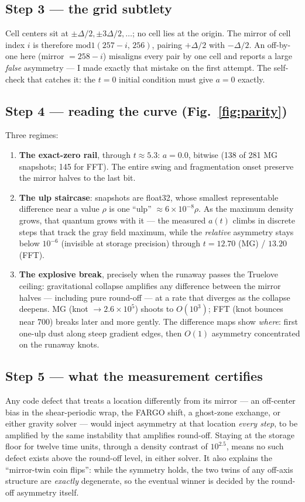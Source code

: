 \documentclass[11pt]{article}
\begin{document}
\subsection*{Step 3 --- the grid subtlety}
Cell centers sit at $\pm\Delta/2, \pm3\Delta/2,\ldots$; no cell lies at the origin.
The mirror of cell index $i$ is therefore $\mathrm{mod1}(257 - i,\,256)$, pairing
$+\Delta/2$ with $-\Delta/2$. An off-by-one here (mirror $= 258 - i$) misaligns
every pair by one cell and reports a large \emph{false} asymmetry --- I made
exactly that mistake on the first attempt. The self-check that catches it: the
$t = 0$ initial condition must give $a = 0$ exactly.

\subsection*{Step 4 --- reading the curve (Fig.~\ref{fig:parity})}
Three regimes:
\begin{enumerate}
\item \textbf{The exact-zero rail}, through $t \approx 5.3$: $a = 0.0$, bitwise
  (138 of 281 MG snapshots; 145 for FFT). The entire swing and fragmentation onset
  preserve the mirror halves to the last bit.
\item \textbf{The ulp staircase}: snapshots are float32, whose smallest
  representable difference near a value $\rho$ is one ``ulp'' $\approx
  6\times10^{-8}\rho$. As the maximum density grows, that quantum grows with it ---
  the measured $a(t)$ climbs in discrete steps that track the gray field maximum,
  while the \emph{relative} asymmetry stays below $10^{-6}$ (invisible at storage
  precision) through $t = 12.70$ (MG) / $13.20$ (FFT).
\item \textbf{The explosive break}, precisely when the runaway passes the Truelove
  ceiling: gravitational collapse amplifies any difference between the mirror
  halves --- including pure round-off --- at a rate that diverges as the collapse
  deepens. MG (knot $\to 2.6\times10^5$) shoots to $O(10^3)$; FFT (knot bounces
  near $700$) breaks later and more gently. The difference maps show \emph{where}:
  first one-ulp dust along steep gradient edges, then $O(1)$ asymmetry concentrated
  on the runaway knots.
\end{enumerate}

\subsection*{Step 5 --- what the measurement certifies}
Any code defect that treats a location differently from its mirror --- an
off-center bias in the shear-periodic wrap, the FARGO shift, a ghost-zone exchange,
or either gravity solver --- would inject asymmetry at that location \emph{every
step}, to be amplified by the same instability that amplifies round-off. Staying at
the storage floor for twelve time units, through a density contrast of $10^{2.5}$,
means no such defect exists above the round-off level, in either solver. It also
explains the ``mirror-twin coin flips'': while the symmetry holds, the two twins of
any off-axis structure are \emph{exactly} degenerate, so the eventual winner is
decided by the round-off asymmetry itself.
\end{document}
